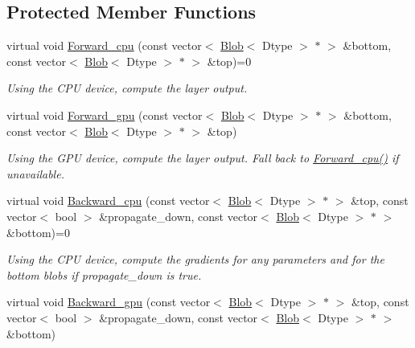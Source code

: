 \subsection*{Protected Member Functions}
\begin{DoxyCompactItemize}
\item 
virtual void \hyperlink{classcaffe_1_1Layer_add965883f75bbf90c7a06f960cda7a1a}{Forward\+\_\+cpu} (const vector$<$ \hyperlink{classcaffe_1_1Blob}{Blob}$<$ Dtype $>$ $\ast$ $>$ \&bottom, const vector$<$ \hyperlink{classcaffe_1_1Blob}{Blob}$<$ Dtype $>$ $\ast$ $>$ \&top)=0\hypertarget{classcaffe_1_1Layer_add965883f75bbf90c7a06f960cda7a1a}{}\label{classcaffe_1_1Layer_add965883f75bbf90c7a06f960cda7a1a}

\begin{DoxyCompactList}\small\item\em Using the C\+PU device, compute the layer output. \end{DoxyCompactList}\item 
virtual void \hyperlink{classcaffe_1_1Layer_a93b8d8c30c7691a39f634bf7bb2b03fb}{Forward\+\_\+gpu} (const vector$<$ \hyperlink{classcaffe_1_1Blob}{Blob}$<$ Dtype $>$ $\ast$ $>$ \&bottom, const vector$<$ \hyperlink{classcaffe_1_1Blob}{Blob}$<$ Dtype $>$ $\ast$ $>$ \&top)\hypertarget{classcaffe_1_1Layer_a93b8d8c30c7691a39f634bf7bb2b03fb}{}\label{classcaffe_1_1Layer_a93b8d8c30c7691a39f634bf7bb2b03fb}

\begin{DoxyCompactList}\small\item\em Using the G\+PU device, compute the layer output. Fall back to \hyperlink{classcaffe_1_1Layer_add965883f75bbf90c7a06f960cda7a1a}{Forward\+\_\+cpu()} if unavailable. \end{DoxyCompactList}\item 
virtual void \hyperlink{classcaffe_1_1Layer_a64d15855f882af4b82e83fa993c4e7c6}{Backward\+\_\+cpu} (const vector$<$ \hyperlink{classcaffe_1_1Blob}{Blob}$<$ Dtype $>$ $\ast$ $>$ \&top, const vector$<$ bool $>$ \&propagate\+\_\+down, const vector$<$ \hyperlink{classcaffe_1_1Blob}{Blob}$<$ Dtype $>$ $\ast$ $>$ \&bottom)=0\hypertarget{classcaffe_1_1Layer_a64d15855f882af4b82e83fa993c4e7c6}{}\label{classcaffe_1_1Layer_a64d15855f882af4b82e83fa993c4e7c6}

\begin{DoxyCompactList}\small\item\em Using the C\+PU device, compute the gradients for any parameters and for the bottom blobs if propagate\+\_\+down is true. \end{DoxyCompactList}\item 
virtual void \hyperlink{classcaffe_1_1Layer_a9275e5b8196feac9cf22803973c890f9}{Backward\+\_\+gpu} (const vector$<$ \hyperlink{classcaffe_1_1Blob}{Blob}$<$ Dtype $>$ $\ast$ $>$ \&top, const vector$<$ bool $>$ \&propagate\+\_\+down, const vector$<$ \hyperlink{classcaffe_1_1Blob}{Blob}$<$ Dtype $>$ $\ast$ $>$ \&bottom)\hypertarget{classcaffe_1_1Layer_a9275e5b8196feac9cf22803973c890f9}{}\label{classcaffe_1_1Layer_a9275e5b8196feac9cf22803973c890f9}


\end{DoxyCompactItemize}
